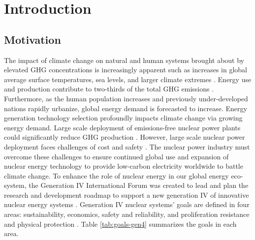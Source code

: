 \chapter{Introduction}
\label{chap:intro}


\section{Motivation}
The impact of climate change on natural and human systems brought about by 
elevated \gls{GHG} concentrations is increasingly apparent such as increases 
in global average surface temperatures, sea levels, and larger climate extremes 
\cite{noauthor_climate_2018}.
Energy use and production contribute to two-thirds of the total \gls{GHG}
emissions \cite{noauthor_climate_2018}.
Furthermore, as the human population increases and previously under-developed 
nations rapidly urbanize, global energy demand is forecasted to increase.  
Energy generation technology selection profoundly impacts climate change via 
growing energy demand. 
Large scale deployment of emissions-free nuclear power plants could 
significantly reduce GHG production \cite{noauthor_climate_2018}.  
However, large scale nuclear power deployment faces challenges of cost and 
safety \cite{petti_future_2018}. 
The nuclear power industry must overcome these challenges to ensure continued 
global use and expansion of nuclear energy technology to provide low-carbon 
electricity worldwide to battle climate change.
To enhance the role of nuclear energy in our global energy 
eco-system, the Generation IV International Forum was created to lead and plan 
the research and development roadmap to support a new generation IV of innovative 
nuclear energy systems \cite{gif_technology_2002}.
Generation IV nuclear systems' goals are defined in four areas: sustainability, 
economics, safety and reliability, and proliferation resistance and physical 
protection \cite{gif_technology_2002}. 
Table \ref{tab:goals-gen4} summarizes the goals in each area. 

